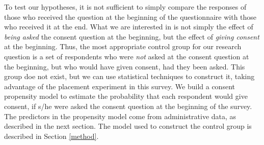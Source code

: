 To test our hypotheses, it is not sufficient to simply compare the responses of those who received the question at the beginning of the questionnaire with those who received it at the end. What we are interested in is not simply the effect of \textit{being asked} the consent question at the beginning, but the effect of \textit{giving consent} at the beginning. Thus, the most appropriate control group for our research question is a set of respondents who were \textit{not} asked at the consent question at the beginning, but who would have given consent, had they been asked. This group doe not exist, but we can use statistical techniques to construct it, taking advantage of the placement experiment in this survey. We build a consent propensity model to estimate the probability that each respondent would give consent, if s/he were asked the consent question at the beginning of the survey. The predictors in the propensity model come from administrative data, as described in the next section. The model used to construct the control group is described in Section \ref{method}. 



% 





